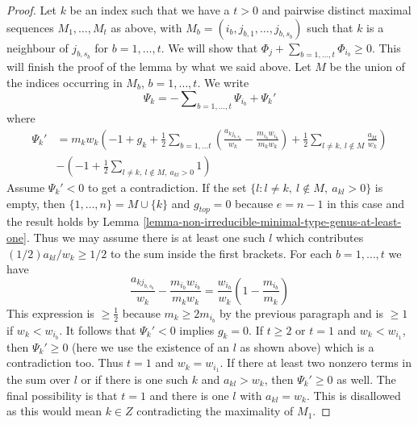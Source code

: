 \begin{proof}
\medskip\noindent
Let $k$ be an index such that we have a $t > 0$ and pairwise distinct
maximal sequences $M_1, \ldots, M_t$ as above, with
$M_b = (i_b, j_{b, 1}, \ldots, j_{b, s_b})$
such that $k$ is a neighbour of $j_{b, s_b}$ for $b = 1, \ldots, t$.
We will show that $\Phi_j + \sum_{b = 1, \ldots, t} \Phi_{i_b} \geq 0$.
This will finish the proof of the lemma by what we said above.
Let $M$ be the union of the indices occurring in $M_b$, $b = 1, \ldots, t$.
We write
$$
\Psi_k =
-\sum\nolimits_{b = 1, \ldots, t} \Psi_{i_b} + \Psi_k'
$$
where
\begin{align*}
\Psi_k' & =
m_kw_k\left(-1 + g_k +
\frac{1}{2} \sum\nolimits_{b = 1, \ldots t}
(\frac{a_{kj_{b, s_b}}}{w_k} - \frac{m_{i_b}w_{i_b}}{m_kw_k}) +
\frac{1}{2} \sum\nolimits_{l \not = k,\ l \not \in M}
\frac{a_{kl}}{w_k}
\right) \\
&
-\left(
-1 + \frac{1}{2}\sum\nolimits_{l \not = k,\ l \not \in M,\ a_{kl} > 0} 1
\right)
\end{align*}
Assume $\Psi_k' < 0$ to get a contradiction.
If the set $\{l : l \not = k,\ l \not \in M,\ a_{kl} > 0\}$ is empty,
then $\{1, \ldots, n\} = M \cup \{k\}$ and $g_{top} = 0$
because $e = n - 1$ in this case and the result holds by
Lemma \ref{lemma-non-irreducible-minimal-type-genus-at-least-one}.
Thus we may assume there is at least one such $l$ which contributes
$(1/2)a_{kl}/w_k \geq 1/2$ to the sum inside the first brackets.
For each $b = 1, \ldots, t$ we have
$$
\frac{a_{kj_{b, s_b}}}{w_k} - \frac{m_{i_b}w_{i_b}}{m_kw_k} =
\frac{w_{i_b}}{w_k}(1 - \frac{m_{i_b}}{m_k})
$$
This expression is $\geq \frac{1}{2}$ because $m_k \geq 2m_{i_b}$
by the previous paragraph and is $\geq 1$ if $w_k < w_{i_b}$.
It follows that $\Psi_k' < 0$ implies $g_k = 0$.
If $t \geq 2$ or $t = 1$ and $w_k < w_{i_1}$, then $\Psi_k' \geq 0$
(here we use the existence of an $l$ as shown above) which
is a contradiction too.
Thus $t = 1$ and $w_k = w_{i_1}$. If there at least two nonzero terms
in the sum over $l$ or if there is one such $k$ and $a_{kl} > w_k$, then
$\Psi_k' \geq 0$ as well. The final possibility is that $t = 1$ and
there is one $l$ with $a_{kl} = w_k$. This is disallowed as this would
mean $k \in Z$ contradicting the maximality of $M_1$.
\end{proof}
